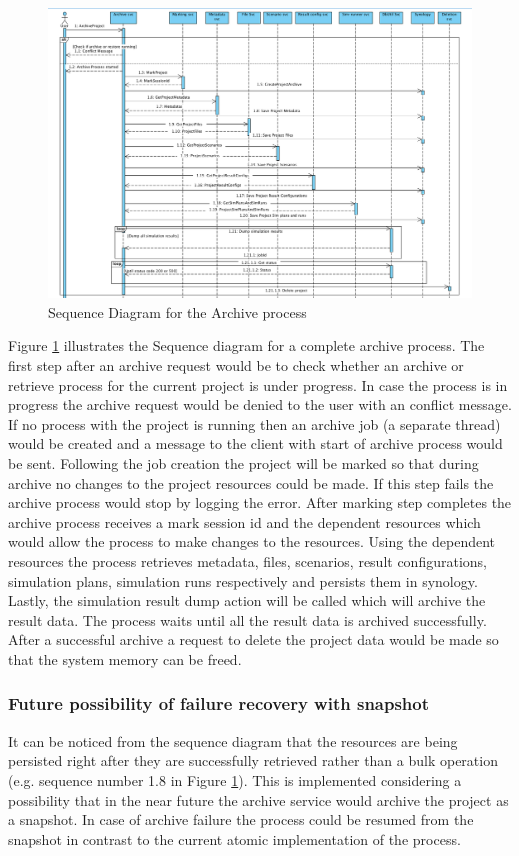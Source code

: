 \newpage
\begin{figure}[H]
    \centering \includegraphics[scale=0.5, angle=90, origin=c]{grafiken/sequenceArchive.png}
    \caption{Sequence Diagram for the Archive process}
    \label{fig:sequenceArchive}
\end{figure}

Figure \ref{fig:sequenceArchive} illustrates the Sequence diagram for a complete archive process. The first step after an archive request would be to check
whether an archive or retrieve process for the current project is under progress. In case the process is in progress the archive request would be denied to the
user with an conflict message. If no process with the project is running then an archive job (a separate thread) would be created and a message to the client with start of archive process would be
sent. Following the job creation the project will be marked so that during archive no changes to the project resources could be made. If this step fails the archive 
process would stop by logging the error. After marking step completes the archive process receives a mark session id and the dependent resources which would allow the process to make
changes to the resources. Using the dependent resources the process retrieves metadata, files, scenarios, result configurations, simulation plans, simulation runs 
respectively and persists them in synology. Lastly, the simulation result dump action will be called which will archive the result data. The process waits until
all the result data is archived successfully. After a successful archive a request to delete the project data would be made so that the system memory can be freed.

\subsubsection{Future possibility of failure recovery with snapshot}
It can be noticed from the sequence diagram that the resources are being persisted right after they are successfully retrieved rather than a bulk operation
(e.g. sequence number 1.8 in Figure \ref{fig:sequenceArchive}). This
is implemented considering a possibility that in the near future the archive service would archive the project as a snapshot. In case of archive failure the process
could be resumed from the snapshot in contrast to the current atomic implementation of the process.

